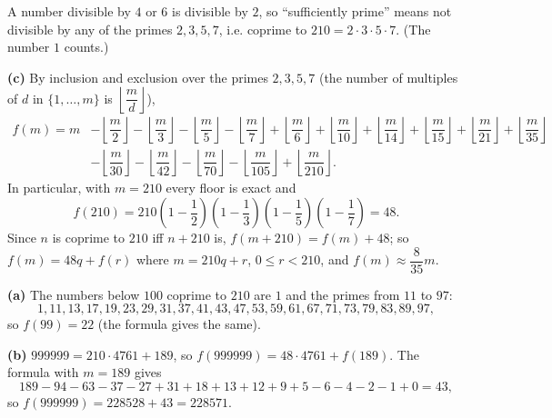 A number divisible by \(4\) or \(6\) is divisible by \(2\), so ``sufficiently prime'' means not divisible by any of the primes \(2,3,5,7\), i.e. coprime to \(210=2\cdot3\cdot5\cdot7\). (The number \(1\) counts.)

\textbf{(c)} By inclusion and exclusion over the primes \(2,3,5,7\) (the number of multiples of \(d\) in \(\{1,\dots,m\}\) is \(\left\lfloor\dfrac {m}{d}\right\rfloor\)),
\[
\begin{aligned}
f(m)=m&-\left\lfloor\dfrac {m}{2}\right\rfloor-\left\lfloor\dfrac {m}{3}\right\rfloor-\left\lfloor\dfrac {m}{5}\right\rfloor-\left\lfloor\dfrac {m}{7}\right\rfloor
+\left\lfloor\dfrac {m}{6}\right\rfloor+\left\lfloor\dfrac {m}{10}\right\rfloor+\left\lfloor\dfrac {m}{14}\right\rfloor+\left\lfloor\dfrac {m}{15}\right\rfloor+\left\lfloor\dfrac {m}{21}\right\rfloor+\left\lfloor\dfrac {m}{35}\right\rfloor\\
&-\left\lfloor\dfrac {m}{30}\right\rfloor-\left\lfloor\dfrac {m}{42}\right\rfloor-\left\lfloor\dfrac {m}{70}\right\rfloor-\left\lfloor\dfrac {m}{105}\right\rfloor+\left\lfloor\dfrac {m}{210}\right\rfloor .
\end{aligned}
\]
In particular, with \(m=210\) every floor is exact and
\[
f(210)=210\left(1-\dfrac{1}{2}\right)\left(1-\dfrac{1}{3}\right)\left(1-\dfrac{1}{5}\right)\left(1-\dfrac{1}{7}\right)=48 .
\]
Since \(n\) is coprime to \(210\) iff \(n+210\) is, \(f(m+210)=f(m)+48\); so \(f(m)=48q+f(r)\) where \(m=210q+r\), \(0\le r<210\), and \(f(m)\approx\dfrac{8}{35}m\).

\textbf{(a)} The numbers below \(100\) coprime to \(210\) are \(1\) and the primes from \(11\) to \(97\):
\[
1,11,13,17,19,23,29,31,37,41,43,47,53,59,61,67,71,73,79,83,89,97,
\]
so \(f(99)=\boxed{22}\) (the formula gives the same).

\textbf{(b)} \(999999=210\cdot4761+189\), so \(f(999999)=48\cdot4761+f(189)\). The formula with \(m=189\) gives
\[
189-94-63-37-27+31+18+13+12+9+5-6-4-2-1+0=43,
\]
so \(f(999999)=228528+43=\boxed{228571}\).
